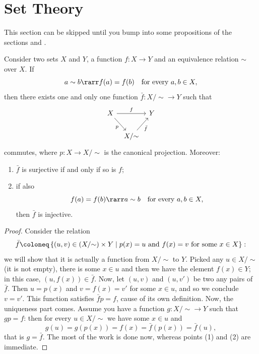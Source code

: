 
\section{Set Theory}

\begin{note}
This section can be skipped until you bump into some propositions of the sections  and .
\end{note}

\begin{proposition}\label{prop:SetIso1}
Consider two sets \(X\) and \(Y\), a function \(f : X \to Y\) and an equivalence relation \(\sim\) over \(X\). If
\[a \sim b \rarr f(a) = f(b) \quad\text{for every } a, b \in X ,\]
then there exists one and only one function \(\bar f : X{/}{\sim} \to Y\) such that
\[\begin{tikzcd}[column sep=tiny]
X \ar["f", rr] \ar["p", swap, dr] & & Y \\
& X{/}{\sim} \ar["{\bar f}", swap, ur]
\end{tikzcd}\]
commutes, where \(p : X \to X{/}{\sim}\) is the canonical projection. Moreover: 
\begin{enumerate}
\item \(\bar f\) is surjective if and only if so is \(f\);
\item if also
\[f(a) = f(b) \rarr a \sim b \quad\text{for every } a, b \in X ,\]
then \(\bar f\) is injective.
\end{enumerate}
\end{proposition}

\begin{proof}
Consider the relation
\[\bar f \coloneq \set{(u, v) \in \mathcal (X{/}{\sim}) \times Y \mid p(x) = u \text{ and } f(x) = v \text{ for some } x \in X} :\]
we will show that it is actually a function from \(X{/}{\sim}\) to \(Y\). Picked any \(u \in X{/}{\sim}\) (it is not empty), there is some \(x \in u\) and then we have the element \(f(x) \in Y\); in this case, \((u, f(x)) \in \bar f\). Now, let \((u, v)\) and \((u, v')\) be two any pairs of \(\bar f\). Then \(u = p(x)\) and \(v = f(x) = v'\) for some \(x \in u\), and so we conclude \(v = v'\). This function satisfies \(\bar f p = f\), cause of its own definition.\newline
Now, the uniqueness part comes. Assume you have a function \(g : X{/}{\sim} \to Y\) such that \(gp = f\): then for every \(u \in X{/}{\sim}\) we have some \(x \in u\) and
\[g(u) = g(p(x)) = f(x) = \bar f (p(x)) = \bar f(u) ,\]
that is \(g = \bar f\).\newline
The most of the work is done now, whereas points (1) and (2) are immediate.
\end{proof}

